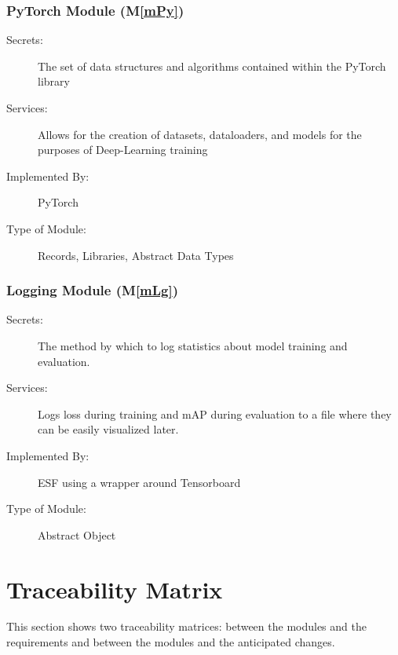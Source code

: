 \documentclass[12pt, titlepage]{article}
\newcommand{\ProjectName}{ESF }
\newcommand{\mref}[1]{M\ref{#1}}
\begin{document}
\subsubsection{PyTorch Module (\mref{mPy})}
\begin{description}
\item[Secrets:] The set of data structures and algorithms contained within the PyTorch library
\item[Services:] Allows for the creation of datasets, dataloaders, and models for the purposes of Deep-Learning training
\item[Implemented By:] PyTorch
\item[Type of Module:] Records, Libraries, Abstract Data Types
\end{description}

\subsubsection{Logging Module (\mref{mLg})}
\begin{description}
\item[Secrets:] The method by which to log statistics about model training and evaluation.
\item[Services:] Logs loss during training and mAP during evaluation to a file where they can be easily visualized later.
\item[Implemented By:] \ProjectName using a wrapper around Tensorboard
\item[Type of Module:] Abstract Object
\end{description}

\section{Traceability Matrix} \label{SecTM}

This section shows two traceability matrices: between the modules and the
requirements and between the modules and the anticipated changes.
\end{document}
